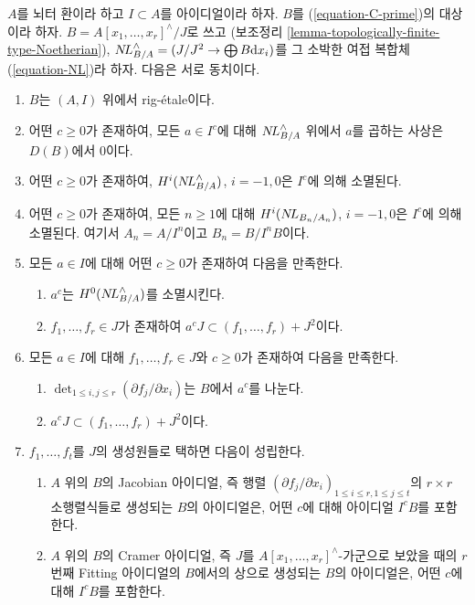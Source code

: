 \begin{lemma}
\label{lemma-equivalent-with-artin}
$A$를 뇌터 환이라 하고 $I \subset A$를 아이디얼이라 하자.
$B$를 (\ref{equation-C-prime})의 대상이라 하자.
$B = A[x_1, \ldots, x_r]^\wedge/J$로 쓰고
(보조정리 \ref{lemma-topologically-finite-type-Noetherian}),
$\mathop{N\!L}\nolimits_{B/A}^\wedge = (J/J^2 \to \bigoplus B\text{d}x_i)$를
그 소박한 여접 복합체 (\ref{equation-NL})라 하자. 다음은 서로 동치이다.
\begin{enumerate}
\item $B$는 $(A, I)$ 위에서 rig-\'etale이다.
\item
\label{item-zero-on-NL}
어떤 $c \geq 0$가 존재하여, 모든 $a \in I^c$에 대해 $\mathop{N\!L}\nolimits_{B/A}^\wedge$ 위에서
$a$를 곱하는 사상은 $D(B)$에서 0이다.
\item
\label{item-zero-on-cohomology-NL}
어떤 $c \geq 0$가 존재하여, $H^i(\mathop{N\!L}\nolimits_{B/A}^\wedge)$, $i = -1, 0$은
$I^c$에 의해 소멸된다.
\item
\label{item-zero-on-cohomology-NL-truncations}
어떤 $c \geq 0$가 존재하여, 모든 $n \geq 1$에 대해
$H^i(\mathop{N\!L}\nolimits_{B_n/A_n})$, $i = -1, 0$은 $I^c$에 의해 소멸된다.
여기서 $A_n = A/I^n$이고 $B_n = B/I^nB$이다.
\item
\label{item-condition-artin-pre-pre}
모든 $a \in I$에 대해 어떤 $c \geq 0$가 존재하여 다음을 만족한다.
\begin{enumerate}
\item $a^c$는 $H^0(\mathop{N\!L}\nolimits_{B/A}^\wedge)$를 소멸시킨다.
\item $f_1, \ldots, f_r \in J$가 존재하여
$a^c J \subset (f_1, \ldots, f_r) + J^2$이다.
\end{enumerate}
\item
\label{item-condition-artin-pre}
모든 $a \in I$에 대해 $f_1, \ldots, f_r \in J$와 $c \geq 0$가 존재하여 다음을 만족한다.
\begin{enumerate}
\item $\det_{1 \leq i, j \leq r}(\partial f_j/\partial x_i)$는 $B$에서 $a^c$를 나눈다.
\item $a^c J \subset (f_1, \ldots, f_r) + J^2$이다.
\end{enumerate}
\item
\label{item-condition-artin}
$f_1, \ldots, f_t$를 $J$의 생성원들로 택하면 다음이 성립한다.
\begin{enumerate}
\item $A$ 위의 $B$의 Jacobian 아이디얼, 즉
행렬 $(\partial f_j/\partial x_i)_{1 \leq i \leq r, 1 \leq j \leq t}$의
$r \times r$ 소행렬식들로 생성되는 $B$의 아이디얼은,
어떤 $c$에 대해 아이디얼 $I^cB$를 포함한다.
\item $A$ 위의 $B$의 Cramer 아이디얼, 즉
$J$를 $A[x_1, \ldots, x_r]^\wedge$-가군으로 보았을 때의
$r$번째 Fitting 아이디얼의 $B$에서의 상으로 생성되는 $B$의 아이디얼은,
어떤 $c$에 대해 $I^cB$를 포함한다.
\end{enumerate}
\end{enumerate}
\end{lemma}

